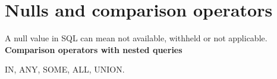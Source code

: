 \documentclass[english]{exam}
\begin{document}
	
    \section{Nulls and comparison operators}
    
    A null value in SQL can mean not available, withheld or not applicable.\\
    
    \textbf{Comparison operators with nested queries}
    
    IN, ANY, SOME, ALL, UNION.
    
\end{document}

